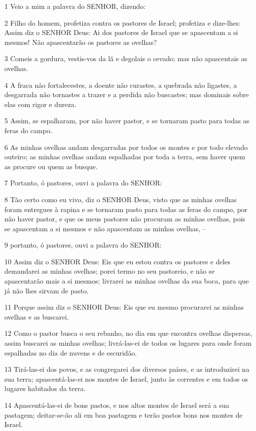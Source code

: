 \par 1 Veio a mim a palavra do SENHOR, dizendo:
\par 2 Filho do homem, profetiza contra os pastores de Israel; profetiza e dize-lhes: Assim diz o SENHOR Deus: Ai dos pastores de Israel que se apascentam a si mesmos! Não apascentarão os pastores as ovelhas?
\par 3 Comeis a gordura, vestis-vos da lã e degolais o cevado; mas não apascentais as ovelhas.
\par 4 A fraca não fortalecestes, a doente não curastes, a quebrada não ligastes, a desgarrada não tornastes a trazer e a perdida não buscastes; mas dominais sobre elas com rigor e dureza.
\par 5 Assim, se espalharam, por não haver pastor, e se tornaram pasto para todas as feras do campo.
\par 6 As minhas ovelhas andam desgarradas por todos os montes e por todo elevado outeiro; as minhas ovelhas andam espalhadas por toda a terra, sem haver quem as procure ou quem as busque.
\par 7 Portanto, ó pastores, ouvi a palavra do SENHOR:
\par 8 Tão certo como eu vivo, diz o SENHOR Deus, visto que as minhas ovelhas foram entregues à rapina e se tornaram pasto para todas as feras do campo, por não haver pastor, e que os meus pastores não procuram as minhas ovelhas, pois se apascentam a si mesmos e não apascentam as minhas ovelhas, --
\par 9 portanto, ó pastores, ouvi a palavra do SENHOR:
\par 10 Assim diz o SENHOR Deus: Eis que eu estou contra os pastores e deles demandarei as minhas ovelhas; porei termo no seu pastoreio, e não se apascentarão mais a si mesmos; livrarei as minhas ovelhas da sua boca, para que já não lhes sirvam de pasto.
\par 11 Porque assim diz o SENHOR Deus: Eis que eu mesmo procurarei as minhas ovelhas e as buscarei.
\par 12 Como o pastor busca o seu rebanho, no dia em que encontra ovelhas dispersas, assim buscarei as minhas ovelhas; livrá-las-ei de todos os lugares para onde foram espalhadas no dia de nuvens e de escuridão.
\par 13 Tirá-las-ei dos povos, e as congregarei dos diversos países, e as introduzirei na sua terra; apascentá-las-ei nos montes de Israel, junto às correntes e em todos os lugares habitados da terra.
\par 14 Apascentá-las-ei de bons pastos, e nos altos montes de Israel será a sua pastagem; deitar-se-ão ali em boa pastagem e terão pastos bons nos montes de Israel.
